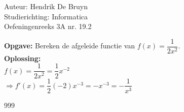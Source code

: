 \documentclass[a4paper]{article}
\begin{document}
  
\noindent \large Auteur: Hendrik De Bruyn \\
\noindent \large Studierichting: Informatica\\
\noindent \large Oefeningenreeks 3A nr. 19.2\\

\medskip

\normalsize

\textbf{Opgave:} Bereken de afgeleide functie van $f(x) = \dfrac{1}{2x^2}$. \\

\textbf{Oplossing:} \\

$f(x) = \dfrac{1}{2x^2} = \dfrac{1}{2} x^{-2}$ \\

$\Rightarrow f'(x) = \dfrac{1}{2} (-2) x^{-3} = -x^{-3} = -\dfrac{1}{x^3}$ \\

\begin{thebibliography}{999}
\end{thebibliography}
\end{document}
